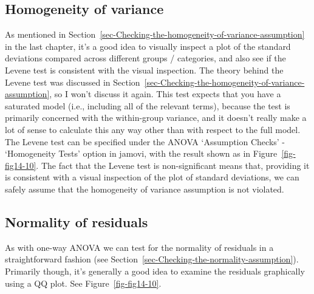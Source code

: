 \documentclass[
  a4paper,
]{book}
\begin{document}
\hypertarget{homogeneity-of-variance}{%
\subsection{Homogeneity of variance}\label{homogeneity-of-variance}}

As mentioned in
Section~\ref{sec-Checking-the-homogeneity-of-variance-assumption} in the
last chapter, it's a good idea to visually inspect a plot of the
standard deviations compared across different groups / categories, and
also see if the Levene test is consistent with the visual inspection.
The theory behind the Levene test was discussed in
Section~\ref{sec-Checking-the-homogeneity-of-variance-assumption}, so I
won't discuss it again. This test expects that you have a saturated
model (i.e., including all of the relevant terms), because the test is
primarily concerned with the within-group variance, and it doesn't
really make a lot of sense to calculate this any way other than with
respect to the full model. The Levene test can be specified under the
ANOVA `Assumption Checks' - `Homogeneity Tests' option in jamovi, with
the result shown as in Figure~\ref{fig-fig14-10}. The fact that the
Levene test is non-significant means that, providing it is consistent
with a visual inspection of the plot of standard deviations, we can
safely assume that the homogeneity of variance assumption is not
violated.

\hypertarget{normality-of-residuals}{%
\subsection{Normality of residuals}\label{normality-of-residuals}}

As with one-way ANOVA we can test for the normality of residuals in a
straightforward fashion (see
Section~\ref{sec-Checking-the-normality-assumption}). Primarily though,
it's generally a good idea to examine the residuals graphically using a
QQ plot. See Figure~\ref{fig-fig14-10}.
\end{document}
